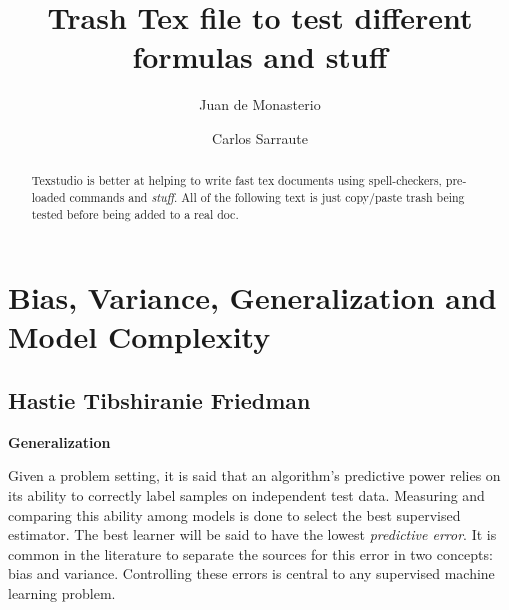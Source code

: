 \documentclass{article}%
\theoremstyle{definition}
\begin{document}

\title{Trash Tex file to test different formulas and stuff}




\author{
Juan de Monasterio
\and Carlos Sarraute
}

%
%


\maketitle
\begin{abstract}

Texstudio is better at helping to write fast tex documents using spell-checkers, pre-loaded commands and \textit{stuff}. All of the following text is just copy/paste trash being tested before being added to a real doc.


\end{abstract}


 
 \section{Bias, Variance, Generalization and Model Complexity}
 
 
 \subsection{Hastie Tibshiranie Friedman}
 
 \textbf{Generalization}
 
 Given a problem setting, it is said that an algorithm's predictive power relies on its ability to correctly label samples on independent test data. Measuring and comparing this ability among models is done to select the best supervised estimator.  The best learner will be said to have the lowest \textit{predictive error}. It is common in the literature \cite{james-biasVarianceGeneral} to separate the sources for this error in two concepts: bias and variance. Controlling these errors is central to any supervised machine learning problem.
 
\end{document}
